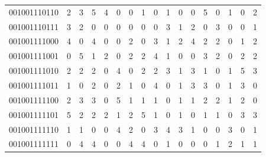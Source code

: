 \documentclass[10pt,a4paper]{article}
\begin{document}
\begin{longtable}{ |c|c|c|c|c|c|c|c|c|c|c|c|c|c|c|c|c| }
    001001110110              & 2                            & 3                                & 5                            & 4                              & 0   & 0   & 1   & 0   & 1   & 0   & 0   & 5   & 0   & 1   & 0   & 2   \\
    001001110111              & 3                            & 2                                & 0                            & 0                              & 0   & 0   & 0   & 0   & 3   & 1   & 2   & 0   & 3   & 0   & 0   & 1   \\
    001001111000              & 4                            & 0                                & 4                            & 0                              & 0   & 2   & 0   & 3   & 1   & 2   & 4   & 2   & 2   & 0   & 1   & 2   \\
    001001111001              & 0                            & 5                                & 1                            & 2                              & 0   & 2   & 2   & 4   & 1   & 0   & 0   & 3   & 2   & 0   & 2   & 2   \\
    001001111010              & 2                            & 2                                & 2                            & 0                              & 4   & 0   & 2   & 2   & 3   & 1   & 3   & 1   & 0   & 1   & 5   & 3   \\
    001001111011              & 1                            & 0                                & 2                            & 0                              & 2   & 1   & 0   & 4   & 0   & 1   & 3   & 3   & 0   & 1   & 3   & 0   \\
    001001111100              & 2                            & 3                                & 3                            & 0                              & 5   & 1   & 1   & 1   & 0   & 1   & 1   & 2   & 2   & 1   & 2   & 0   \\
    001001111101              & 5                            & 2                                & 2                            & 2                              & 1   & 2   & 5   & 1   & 0   & 1   & 0   & 1   & 1   & 0   & 3   & 3   \\
    001001111110              & 1                            & 1                                & 0                            & 0                              & 4   & 2   & 0   & 3   & 4   & 3   & 1   & 0   & 0   & 3   & 0   & 1   \\
    001001111111              & 0                            & 4                                & 4                            & 0                              & 0   & 4   & 4   & 0   & 1   & 0   & 0   & 0   & 1   & 2   & 1   & 1   \\

\end{longtable}
\end{document}
